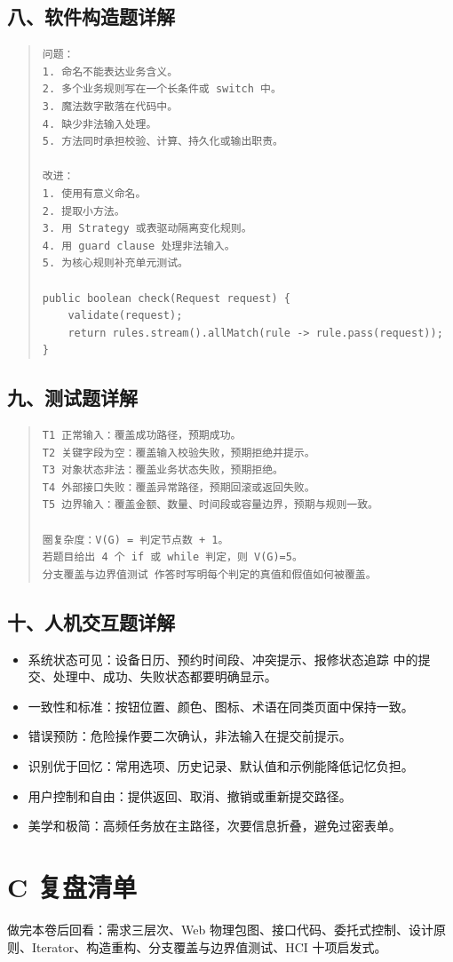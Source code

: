\documentclass[UTF8,zihao=-4]{ctexart}
\begin{document}
\subsection{八、软件构造题详解}


\begin{quote}
\footnotesize
\begin{verbatim}
问题：
1. 命名不能表达业务含义。
2. 多个业务规则写在一个长条件或 switch 中。
3. 魔法数字散落在代码中。
4. 缺少非法输入处理。
5. 方法同时承担校验、计算、持久化或输出职责。

改进：
1. 使用有意义命名。
2. 提取小方法。
3. 用 Strategy 或表驱动隔离变化规则。
4. 用 guard clause 处理非法输入。
5. 为核心规则补充单元测试。

public boolean check(Request request) {
    validate(request);
    return rules.stream().allMatch(rule -> rule.pass(request));
}
\end{verbatim}
\end{quote}



\subsection{九、测试题详解}


\begin{quote}
\footnotesize
\begin{verbatim}
T1 正常输入：覆盖成功路径，预期成功。
T2 关键字段为空：覆盖输入校验失败，预期拒绝并提示。
T3 对象状态非法：覆盖业务状态失败，预期拒绝。
T4 外部接口失败：覆盖异常路径，预期回滚或返回失败。
T5 边界输入：覆盖金额、数量、时间段或容量边界，预期与规则一致。

圈复杂度：V(G) = 判定节点数 + 1。
若题目给出 4 个 if 或 while 判定，则 V(G)=5。
分支覆盖与边界值测试 作答时写明每个判定的真值和假值如何被覆盖。
\end{verbatim}
\end{quote}



\subsection{十、人机交互题详解}


\begin{itemize}
\item 系统状态可见：设备日历、预约时间段、冲突提示、报修状态追踪 中的提交、处理中、成功、失败状态都要明确显示。
\item 一致性和标准：按钮位置、颜色、图标、术语在同类页面中保持一致。
\item 错误预防：危险操作要二次确认，非法输入在提交前提示。
\item 识别优于回忆：常用选项、历史记录、默认值和示例能降低记忆负担。
\item 用户控制和自由：提供返回、取消、撤销或重新提交路径。
\item 美学和极简：高频任务放在主路径，次要信息折叠，避免过密表单。
\end{itemize}



\section{C 复盘清单}


做完本卷后回看：需求三层次、Web 物理包图、接口代码、委托式控制、设计原则、Iterator、构造重构、分支覆盖与边界值测试、HCI 十项启发式。
\end{document}
